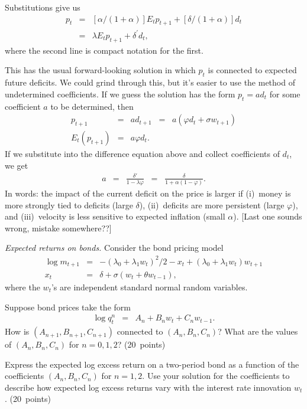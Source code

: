 \documentclass[11pt]{exam}
\begin{document}
\begin{questions}
\begin{solution}
\begin{parts}
\item Substitutions give us
\begin{eqnarray*}
    p_t &=& [\alpha/(1+\alpha)] E_t p_{t+1} + [\delta/(1+\alpha)] d_t \\
        &=& \lambda E_t p_{t+1} + \delta^\prime d_t ,
\end{eqnarray*}
where the second line is compact notation for the first.
\item This has the usual forward-looking solution in which $p_t$
is connected to expected future deficits.
We could grind through this, but it's easier to use the method of undetermined
coefficients.
If we guess the solution has the form $ p_t = a d_t$ for some coefficient $a$ to be determined,
then
\begin{eqnarray*}
    p_{t+1} &=& a d_{t+1} \;\;=\;\; a (\varphi d_t + \sigma w_{t+1}) \\
   E_t (  p_{t+1})  &=&  a \varphi d_t .
\end{eqnarray*}
If we substitute into the difference equation above and collect coefficients
of $d_t$, we get
\begin{eqnarray*}
    a &=& \frac{\delta'}{1-\lambda \varphi}  \;\;=\;\; \frac{\delta}{1+\alpha(1-\varphi)} .
\end{eqnarray*}
In words:  the impact of the current deficit on the price is larger if
(i)~money is more strongly tied to deficits (large $\delta$),
(ii)~deficits are more persistent (large $\varphi$),
and (iii)~velocity is less sensitive to expected inflation (small $\alpha$).
[Last one sounds wrong, mistake somewhere??]
\end{parts}
\end{solution}

\item  {\it Expected returns on bonds.\/}
Consider the bond pricing model
\begin{eqnarray*}
    \log m_{t+1} &=& - (\lambda_0 + \lambda_1 w_t)^2/2 - x_t
            + (\lambda_0 + \lambda_1 w_t) w_{t+1} \\
            x_{t} &=& \delta + \sigma (w_t + \theta w_{t-1}) ,
\end{eqnarray*}
where the $w_t$'s are  independent standard normal random variables.
%
\begin{parts}
\item Suppose bond prices take the form
\begin{eqnarray*}
    \log q^n_t &=& A_n + B_n w_t + C_n w_{t-1} .
\end{eqnarray*}
How is $(A_{n+1},B_{n+1},C_{n+1})$ connected to $(A_{n},B_{n},C_{n})$?
What are the values of $(A_{n},B_{n},C_{n})$ for $n=0,1,2$?
(20~points)
\item Express the expected log excess return on a two-period bond as a function
of the coefficients $(A_{n},B_{n},C_{n})$ for $n=1,2$.
Use your solution for the coefficients to describe how expected log excess returns vary with the
interest rate innovation $w_t$.
(20~points)
\end{parts}


\end{questions}
\end{document}
